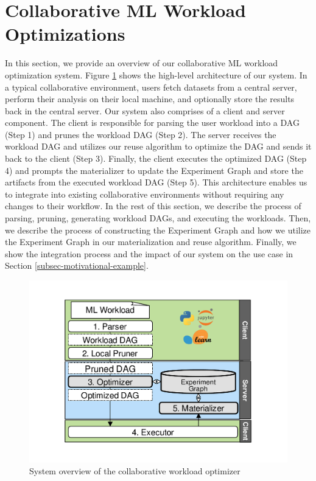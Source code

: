\section{Collaborative ML Workload Optimizations} \label{sec-ml-workloads}
In this section, we provide an overview of our collaborative ML workload optimization system.
Figure \ref{system-workflow} shows the high-level architecture of our system.
In a typical collaborative environment, users fetch datasets from a central server, perform their analysis on their local machine, and optionally store the results back in the central server.
Our system also comprises of a client and server component.
The client is responsible for parsing the user workload into a DAG (Step 1) and prunes the workload DAG (Step 2).
The server receives the workload DAG and utilizes our reuse algorithm to optimize the DAG and sends it back to the client (Step 3).
Finally, the client executes the optimized DAG (Step 4) and prompts the materializer to update the Experiment Graph and store the artifacts from the executed workload DAG (Step 5).
This architecture enables us to integrate into existing collaborative environments without requiring any changes to their workflow.
In the rest of this section, we describe the process of parsing, pruning, generating workload DAGs, and executing the workloads.
Then, we describe the process of constructing the Experiment Graph and how we utilize the Experiment Graph in our materialization and reuse algorithm. 
Finally, we show the integration process and the impact of our system on the use case in Section \ref{subsec-motivational-example}.

\begin{figure}
\centering
\includegraphics[width=0.8\columnwidth]{../images/system-workflow}
\caption{System overview of the collaborative workload optimizer}
\label{system-workflow}
\end{figure}

